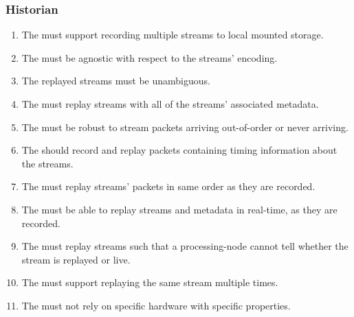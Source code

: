 \subsubsection*{Historian}
\begin{enumerate}[ref=R-A-H\arabic* on P.\thepage]
	\item The  must support recording multiple streams to local mounted storage.\label{req:a:h:recordmultiple}
	\item The  must be agnostic with respect to the streams' encoding.\label{req:a:h:agnostic}
	\item The replayed streams must be unambiguous.
	\label{req:a:h:unambiguous}
	\item The  must replay streams with all of the streams' associated metadata.\label{req:a:h:metadata}
	\item The  must be robust to stream packets arriving out-of-order or never arriving.\label{req:a:h:order}
	\item The \hist{} should record and replay packets containing timing information about the streams.\label{req:a:h:timing}
	\item The  must replay streams' packets in same order as they are recorded.\label{req:a:h:sameorder}
	\item The  must be able to replay streams and metadata in real-time, as they are recorded.\label{req:a:h:realtimereplay}
	\item The  must replay streams such that a processing-node cannot tell whether the stream is replayed or live.\label{req:a:h:liveornot}
	\item The  must support replaying the same stream multiple times.\label{req:a:h:multireplay}
	\item The  must not rely on specific hardware with specific properties.\label{req:a:h:nosepcifichw}
\end{enumerate}


